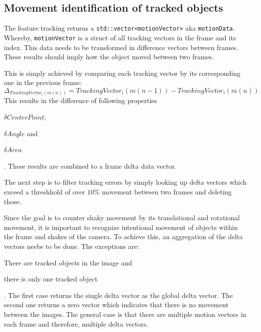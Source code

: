 \subsection{Movement identification of tracked objects}
The feature tracking returns a \texttt{std::vector<motionVector>} aka \texttt{motionData}. Whereby, \texttt{motionVector} is a struct of all tracking vectors in the frame and its index. This data needs to be transformed in difference vectors between frames. These results should imply how the object moved between two frames.

This is simply achieved by comparing each tracking vector by its corresponding one in the previous frame:
\[\Delta_{TrackingVector_i(m(n))} = TrackingVector_i(m(n-1)) - TrackingVector_i(m(n))\]
This results in the difference of following properties \begin{enumerate*}[label= (\roman*)]
    \item $\delta CenterPoint$, \item $\delta Angle$ and \item $\delta Area$
\end{enumerate*}. These results are combined to a frame delta data vector.

The next step is to filter tracking errors by simply looking up delta vectors which exceed a threshhold of over $10\%$ movement between two frames and deleting those.

Since the goal is to counter shaky movement by its translational and rotational movement, it is important to recognize intentional movement of objects within the frame and shakes of the camera. To achieve this, an aggregation of the delta vectors neebs to be done. The exceptions are: \begin{enumerate*}
    \item There are tracked objects in the image and \item there is only one tracked object
\end{enumerate*}. The first case returns the single delta vector as the global delta vector. The second one returns a zero vector which indicates that there is no movement between the images. The general case is that there are multiple motion vectors in each frame and therefore, multiple delta vectors.


